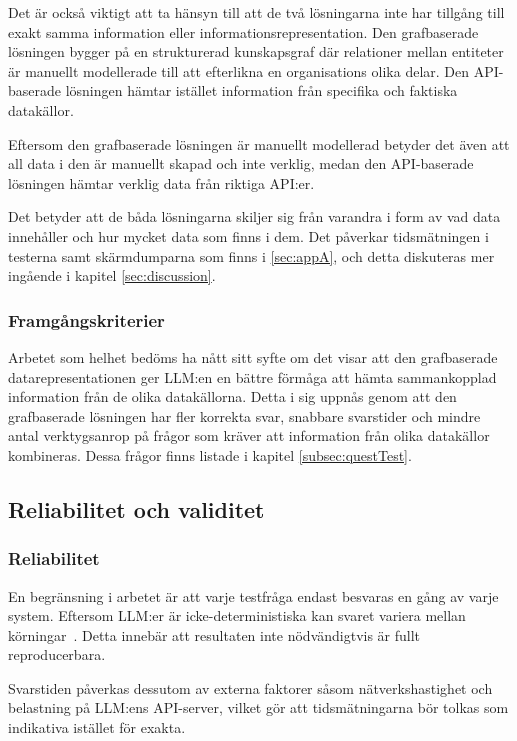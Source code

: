 Det är också viktigt att ta hänsyn till att de två lösningarna inte har tillgång till exakt samma information eller informationsrepresentation.
Den grafbaserade lösningen bygger på en strukturerad kunskapsgraf där relationer mellan entiteter är manuellt modellerade till att efterlikna en organisations olika delar.
Den API-baserade lösningen hämtar istället information från specifika och faktiska datakällor.

Eftersom den grafbaserade lösningen är manuellt modellerad betyder det även att all data i den är manuellt skapad och inte verklig, medan den API-baserade lösningen hämtar verklig data från riktiga API:er.

Det betyder att de båda lösningarna skiljer sig från varandra i form av vad data innehåller och hur mycket data som finns i dem. 
Det påverkar tidsmätningen i testerna samt skärmdumparna som finns i \ref{sec:appA}, och detta diskuteras mer ingående i kapitel \ref{sec:discussion}.

\subsubsection{Framgångskriterier}
Arbetet som helhet bedöms ha nått sitt syfte om det visar att den grafbaserade datarepresentationen ger LLM:en en bättre förmåga att hämta sammankopplad information från de olika datakällorna.
Detta i sig uppnås genom att den grafbaserade lösningen har fler korrekta svar, snabbare svarstider och mindre antal verktygsanrop på frågor som kräver att information från olika datakällor kombineras.
Dessa frågor finns listade i kapitel \ref{subsec:questTest}.

\subsection{Reliabilitet och validitet}\label{subsec:reliabilityvalidity}
\subsubsection{Reliabilitet}
En begränsning i arbetet är att varje testfråga endast besvaras en gång av varje system.
Eftersom LLM:er är icke-deterministiska kan svaret variera mellan körningar~\cite{llm_nondeterminism,llm_background_temperature}.
 Detta innebär att resultaten inte nödvändigtvis är fullt reproducerbara.

Svarstiden påverkas dessutom av externa faktorer såsom nätverkshastighet och belastning på
 LLM:ens API-server, vilket gör att tidsmätningarna bör tolkas som indikativa istället för exakta.

